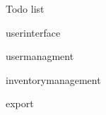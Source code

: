 
\begin{DoxyRefList}
\item[\label{todo__todo000001}%
\Hypertarget{todo__todo000001}%
File \mbox{\hyperlink{backpack_8py}{backpack.py}} ]Todo list
\begin{DoxyItemize}
\item userinterface
\item usermanagment
\item inventorymanagement
\item export 
\end{DoxyItemize}
\end{DoxyRefList}